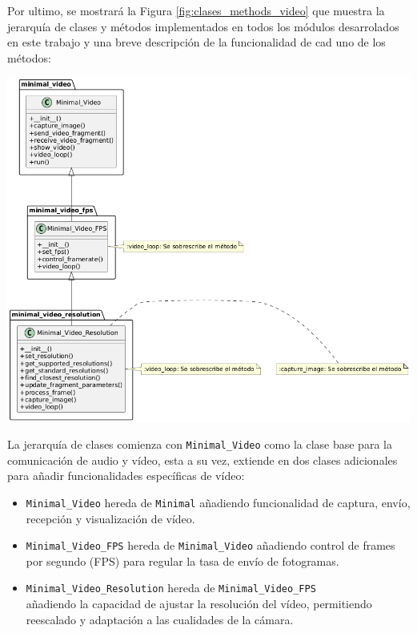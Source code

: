 Por ultimo, se mostrará la Figura \ref{fig:clases_methods_video} que muestra la jerarquía de clases y métodos implementados en todos los módulos desarrolados en este trabajo y una breve descripción de la funcionalidad de cad uno de los métodos:
\begin{center}
    \includegraphics[width = 1\textwidth]{images/uml.png}
    \label{fig:clases_methods_video}
\end{center}

La jerarquía de clases comienza con \texttt{Minimal\_Video} como la clase base para la comunicación de audio y vídeo, esta a su vez, extiende en dos clases adicionales para añadir funcionalidades específicas de vídeo:
\begin{itemize} 
    \item \texttt{Minimal\_Video} hereda de \texttt{Minimal} añadiendo funcionalidad de captura, envío, recepción y visualización de vídeo. 
    \item \texttt{Minimal\_Video\_FPS} hereda de \texttt{Minimal\_Video} añadiendo control de frames por segundo (FPS) para regular la tasa de envío de fotogramas. 
    \item \texttt{Minimal\_Video\_Resolution} hereda de \texttt{Minimal\_Video\_FPS} \\
    añadiendo la capacidad de ajustar la resolución del vídeo, permitiendo reescalado y adaptación a las cualidades de la cámara.
\end{itemize}

